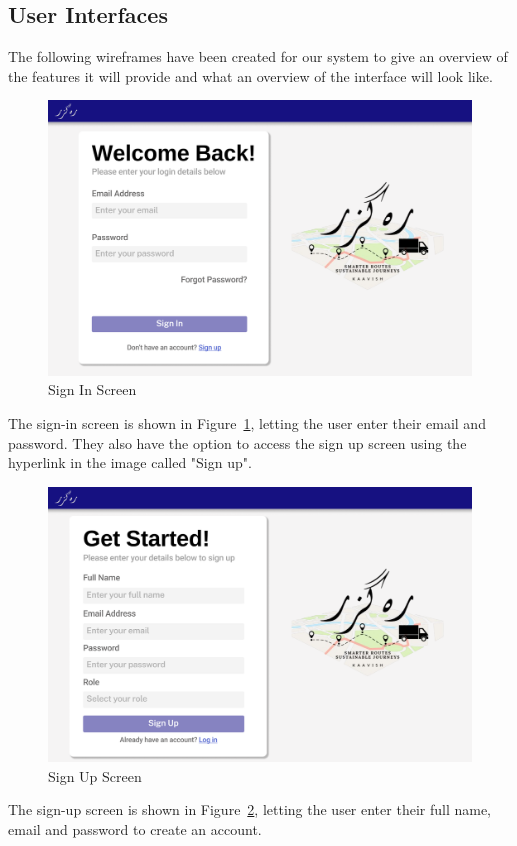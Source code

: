 \subsection{User Interfaces}
The following wireframes have been created for our system to give an overview of the features it will provide and what an overview of the interface will look like.
\begin{figure}[H]
    \centering
    \includegraphics[width=1\textwidth]{images/Login.png} %
    \caption{Sign In Screen}
    \label{fig:image1}
\end{figure}
The sign-in screen is shown in Figure~\ref{fig:image1}, letting the user enter their email and password. They also have the option to access the sign up screen using the hyperlink in the image called "Sign up". 

\begin{figure}[H]
    \centering
    \includegraphics[width=1\textwidth]{images/Sign Up.png} %
    \caption{Sign Up Screen}
    \label{fig:image2}
\end{figure}
The sign-up screen is shown in Figure~\ref{fig:image2}, letting the user enter their full name, email and password to create an account.

